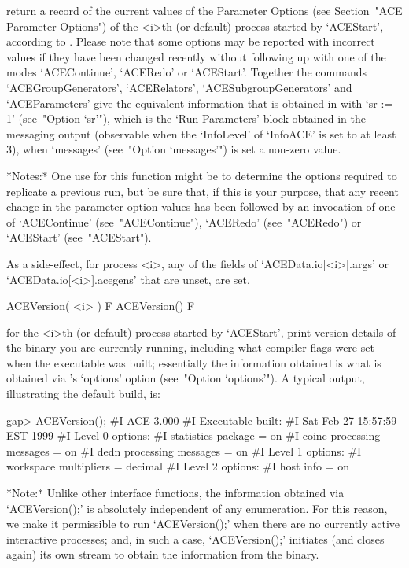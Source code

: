 return a record of the current values of the {\ACE} Parameter  Options
(see Section~"ACE  Parameter  Options")  of  the  <i>th  (or  default)
process started by `ACEStart', according to {\ACE}. Please  note  that
some options may be reported with incorrect values if they  have  been
changed  recently  without  following  up  with  one  of   the   modes
`ACEContinue',  `ACERedo'  or  `ACEStart'.   Together   the   commands
`ACEGroupGenerators',   `ACERelators',   `ACESubgroupGenerators'   and
`ACEParameters'  give  the  equivalent  {\GAP}  information  that   is
obtained in {\ACE} with `sr := 1' (see~"Option `sr'"),  which  is  the
\lq{}Run  Parameters'  block  obtained   in   the   messaging   output
(observable when the `InfoLevel' of `InfoACE' is set to at  least  3),
when `messages' (see~"Option `messages'") is set a non-zero value.

*Notes:*
One use for this function might be to determine the  options  required
to replicate a previous run,  but  be  sure  that,  if  this  is  your
purpose, that any recent change in the  parameter  option  values  has
been   followed   by   an   invocation   of   one   of   `ACEContinue'
(see~"ACEContinue"),   `ACERedo'   (see~"ACERedo")    or    `ACEStart'
(see~"ACEStart").

As a side-effect, for  {\ACE}  process  <i>,  any  of  the  fields  of
`ACEData.io[<i>].args' or `ACEData.io[<i>].acegens'  that  are  unset,
are set.

\>ACEVersion( <i> ) F
\>ACEVersion() F

for the <i>th  (or  default)  process  started  by  `ACEStart',  print
version details of  the  {\ACE}  binary  you  are  currently  running,
including what compiler flags were set when the executable was  built;
essentially the information obtained is what is obtained via  {\ACE}'s
`options'  option  (see~"Option   `options'").   A   typical   output,
illustrating the default build, is:

\beginexample
gap> ACEVersion();
#I  ACE 3.000
#I  Executable built:
#I    Sat Feb 27 15:57:59 EST 1999
#I  Level 0 options:
#I    statistics package = on
#I    coinc processing messages = on
#I    dedn processing messages = on
#I  Level 1 options:
#I    workspace multipliers = decimal
#I  Level 2 options:
#I    host info = on
\endexample

*Note:*
Unlike other {\ACE} interface functions, the information obtained  via
`ACEVersion();' is absolutely independent of any enumeration. For this
reason, we make it permissible to run `ACEVersion();' when  there  are
no currently active interactive {\ACE} processes; and, in such a case,
`ACEVersion();' initiates (and closes again) its own stream to  obtain
the information from the {\ACE} binary.

